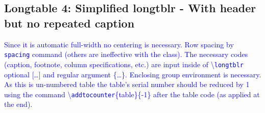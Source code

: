 \documentclass[phd,showgrids]{ndsu-thesis-2022}
\newcommand\italk[1]{\textcolor{blue}{#1}}  %
\newcommand\cmd[1]{\textbackslash\texttt{#1}}  %
\begin{document}
\subsection{Longtable 4: Simplified longtblr - With header but no repeated caption }

\italk{Since it is automatic full-width no centering is necessary. Row spacing by \texttt{spacing} command (others are ineffective with the class). The necessary codes (caption, footnote, column specifications, etc.) are input inside of \cmd{longtblr} optional [\ldots] and regular argument \{\ldots\}. Enclosing group environment is necessary. As this is un-numbered table the table's serial number should be reduced by 1 using the command \cmd{addtocounter}\{table\}\{-1\} after the table code (as applied at the end).}
\end{document}
